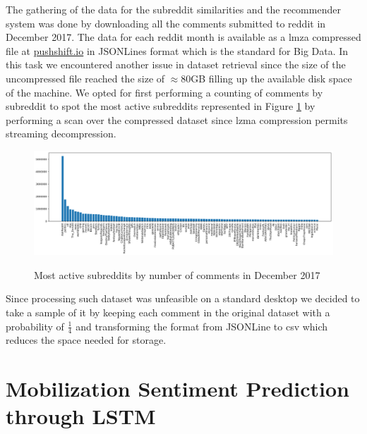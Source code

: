 \documentclass{article}
\begin{document}
The gathering of the data for the subreddit similarities and the recommender
system was done by downloading all the comments submitted to reddit in December
2017. The data for each reddit month is available as a lmza compressed file at
\href{files.pushshift.io}{pushshift.io} in JSONLines format which is the
standard for Big Data. In this task we encountered another issue in dataset
retrieval since the size of the uncompressed file reached the size of $\approx
80$GB filling up the available disk space of the machine. We opted for first
performing a counting of comments by subreddit to spot the most active
subreddits represented in Figure \ref{fig:hist} by performing a scan over the
compressed dataset since lzma compression permits streaming decompression.

\begin{figure}[h]
\centering
\includegraphics[width=\linewidth]{subreddit_activity.png} \\
\caption{Most active subreddits by number of comments in December 2017}
\label{fig:hist}
\end{figure}

Since processing such dataset was unfeasible on a standard desktop we decided to
take a sample of it by keeping each comment in the original dataset with a
probability of $\frac{1}{4}$ and transforming the format from JSONLine to csv
which reduces the space needed for storage.


\section{Mobilization Sentiment Prediction through LSTM}
\label{sec:davide}
\end{document}

